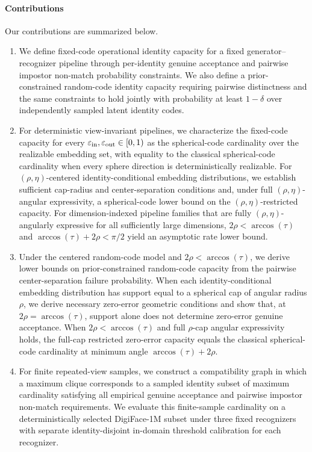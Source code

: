 \documentclass[journal]{IEEEtran}
\begin{document}
\begin{bibunit}

\paragraph*{Contributions}

Our contributions are summarized below.

\begin{enumerate}[leftmargin=*]
%
\item We define fixed-code operational identity capacity for a fixed generator--recognizer pipeline through per-identity genuine acceptance and pairwise impostor non-match probability constraints. We also define a prior-constrained random-code identity capacity requiring pairwise distinctness and the same constraints to hold jointly with probability at least $1-\delta$ over independently sampled latent identity codes.
%
\item For deterministic view-invariant pipelines, we characterize the fixed-code capacity for every $\varepsilon_{\rm in},\varepsilon_{\rm out}\in[0,1)$ as the spherical-code cardinality over the realizable embedding set, with equality to the classical spherical-code cardinality when every sphere direction is deterministically realizable. For $(\rho,\eta)$-centered identity-conditional embedding distributions, we establish sufficient cap-radius and center-separation conditions and, under full $(\rho,\eta)$-angular expressivity, a spherical-code lower bound on the $(\rho,\eta)$-restricted capacity. For dimension-indexed pipeline families that are fully $(\rho,\eta)$-angularly expressive for all sufficiently large dimensions, $2\rho<\arccos(\tau)$ and $\arccos(\tau)+2\rho<\pi/2$ yield an asymptotic rate lower bound.
%
\item Under the centered random-code model and $2\rho<\arccos(\tau)$, we derive lower bounds on prior-constrained random-code capacity from the pairwise center-separation failure probability. When each identity-conditional embedding distribution has support equal to a spherical cap of angular radius $\rho$, we derive necessary zero-error geometric conditions and show that, at $2\rho=\arccos(\tau)$, support alone does not determine zero-error genuine acceptance. When $2\rho<\arccos(\tau)$ and full $\rho$-cap angular expressivity holds, the full-cap restricted zero-error capacity equals the classical spherical-code cardinality at minimum angle $\arccos(\tau)+2\rho$.
%
\item For finite repeated-view samples, we construct a compatibility graph in which a maximum clique corresponds to a sampled identity subset of maximum cardinality satisfying all empirical genuine acceptance and pairwise impostor non-match requirements. We evaluate this finite-sample cardinality on a deterministically selected DigiFace-1M subset under three fixed recognizers with separate identity-disjoint in-domain threshold calibration for each recognizer.
%
\end{enumerate}



\end{bibunit}
\end{document}
